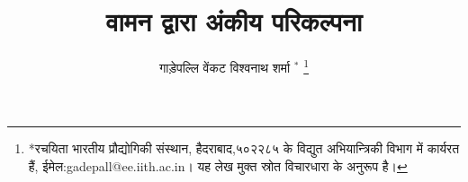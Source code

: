 \documentclass[journal,12pt,twocolumn]{IEEEtran}
\renewcommand\thesection{\arabic{section}}
\begin{document}
\let\StandardTheFigure\thefigure
\let\vec\mathbf
\renewcommand{\thefigure}{\thesection}



\def\putbox#1#2#3{\makebox[0in][l]{\makebox[#1][l]{}\raisebox{\baselineskip}[0in][0in]{\raisebox{#2}[0in][0in]{#3}}}}
     \def\rightbox#1{\makebox[0in][r]{#1}}
     \def\centbox#1{\makebox[0in]{#1}}
     \def\topbox#1{\raisebox{-\baselineskip}[0in][0in]{#1}}
     \def\midbox#1{\raisebox{-0.5\baselineskip}[0in][0in]{#1}}

\vspace{3cm}

\title{
वामन द्वारा अंकीय परिकल्पना
}
\author{ गाड़ेपल्लि वेंकट विश्वनाथ शर्मा $^{*}$%
	\thanks{*रचयिता भारतीय प्रौद्योगिकी संस्थान, हैदराबाद,५०२२८५ के विद्युत अभियान्त्रिकी विभाग में कार्यरत हैं, ईमेल:gadepall@ee.iith.ac.in। यह लेख मुक्त स्रोत विचारधारा के अनुरूप  है।}
	
}	


%
%
%

% 
%
\end{document}
